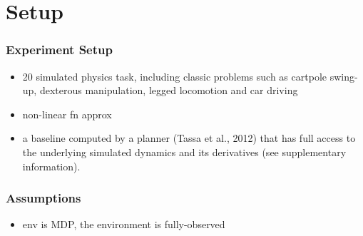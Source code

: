 \section{Setup}

\begin{frame}
\frametitle{Experiment Setup}

\begin{itemize}
  \item 20 simulated physics task,
  including classic problems such as cartpole swing-up, dexterous manipulation, legged locomotion and car driving
  \item non-linear fn approx
  \item a baseline computed by a planner (Tassa et al., 2012) that
  has full access to the underlying simulated dynamics and its derivatives (see supplementary information).
\end{itemize}

\end{frame}


\begin{frame}
\frametitle{Assumptions}

\begin{itemize}
  \item env is MDP, the environment is fully-observed
\end{itemize}

\end{frame}

